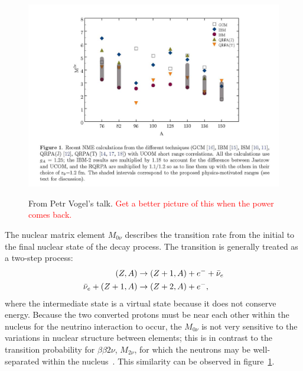 \begin{figure}
\begin{center}
\includegraphics[keepaspectratio=true,width=\textwidth]{MatrixElementComparisonByElement.jpg}
\end{center}
\renewcommand{\baselinestretch}{1}
\small\normalsize
\begin{quote}
\caption{From Petr Vogel's talk.  \textcolor{red}{Get a better picture of this when the power comes back.}}
\label{fig:MatrixElementComparisonVsAtom}
\end{quote}
\end{figure}
\renewcommand{\baselinestretch}{2}
\small\normalsize

The nuclear matrix element $M_{0\nu}$ describes the transition rate from the initial to the final nuclear state of the decay process.  The transition is generally treated as a two-step process:
\begin{align}
(Z,A) &\rightarrow (Z+1,A) + e^{-} + \bar{\nu}_e \notag \\
\bar{\nu}_e + (Z+1,A) &\rightarrow (Z+2,A) + e^{-},
\end{align}
where the intermediate state is a virtual state because it does not conserve energy.  Because the two converted protons must be near each other within the nucleus for the neutrino interaction to occur, the $M_{0\nu}$ is not very sensitive to the variations in nuclear structure between elements; this is in contrast to the transition probability for $\beta\beta 2\nu$, $M_{2\nu}$, for which the neutrons may be well-separated within the nucleus~\cite{PetrVogel0nuAnd2nuMatrixElements}.  This similarity can be observed in figure~\ref{fig:MatrixElementComparisonVsAtom}.

